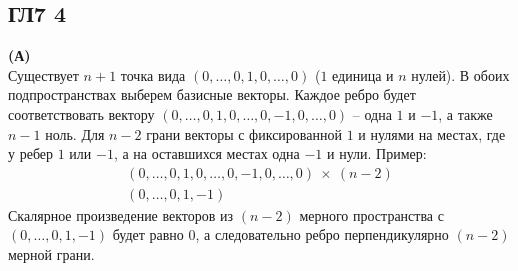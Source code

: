 \subsection*{ГЛ7 4}
\textbf{(А)}\\
Существует $n+1$ точка вида $(0,\ldots, 0, 1, 0, \ldots, 0)$ ($1$ единица и $n$ нулей). В обоих подпространствах выберем базисные векторы. Каждое ребро будет соответствовать вектору $(0, \ldots, 0, 1, 0, \ldots, 0, -1, 0, \ldots, 0)$ -- одна $1$ и $-1$, а также $n-1$ ноль. Для $n-2$ грани векторы с фиксированной $1$ и нулями на местах, где у ребер $1$ или $-1$, а на оставшихся местах одна $-1$ и нули. Пример:
\begin{gather*}
	(0, \ldots, 0, 1, 0, \ldots, 0, -1, 0, \ldots, 0)\ \times\ (n-2)\\
	(0, \ldots, 0, 1, -1)
\end{gather*}
Скалярное произведение векторов из $(n-2)$ мерного пространства с $(0, \ldots, 0, 1, -1)$ будет равно $0$, а следовательно ребро перпендикулярно $(n-2)$ мерной грани.